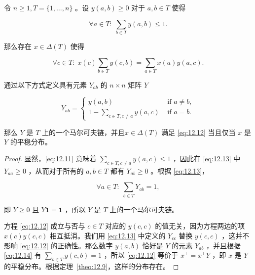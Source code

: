 \begin{lemma}\label{lem:12.10}
令 \(n \geq  1, T = \{ 1,\ldots ,n\}\) 。设 \(y\left( {a,b}\right)  \geq  0\) 对于 \(a,b \in  T\) 使得

\begin{equation}
\forall a \in  T : \;\mathop{\sum }\limits_{{b \in  T}}y\left( {a,b}\right)  \leq  1. \label{eq:12.11}
\end{equation}


那么存在 \(x \in  \Delta \left( T\right)\) 使得

\begin{equation}
\forall c \in  T : \;x\left( c\right) \mathop{\sum }\limits_{{b \in  T}}y\left( {c,b}\right)  = \mathop{\sum }\limits_{{a \in  T}}x\left( a\right) y\left( {a,c}\right) . \label{eq:12.12}
\end{equation}

通过以下方式定义具有元素 \({Y}_{ab}\) 的 \(n \times  n\) 矩阵 \(Y\)

\begin{equation}
{Y}_{ab} = \left\{  \begin{array}{ll} y\left( {a,b}\right) & \text{ if }a \neq  b, \\  1 - \mathop{\sum }\limits_{{c \in  T,c \neq  a}}y\left( {a,c}\right) & \text{ if }a = b. \end{array}\right.  \label{eq:12.13}
\end{equation}

那么 \(Y\) 是 \(T\) 上的一个马尔可夫链，并且\(x \in  \Delta \left( T\right)\) 满足 \eqref{eq:12.12} 当且仅当 \(x\) 是 \(Y\) 的平稳分布。
\end{lemma}

\begin{proof}
显然，\eqref{eq:12.11} 意味着 \(\mathop{\sum }\limits_{{c \in  T,c \neq  a}}y\left( {a,c}\right)  \leq  1\) ，因此在 \eqref{eq:12.13} 中 \({Y}_{aa} \geq  0\) ，从而对于所有的 \(a,b \in  T\) 都有 \({Y}_{ab} \geq  0\) 。根据 \eqref{eq:12.13}，

\begin{equation}
\forall a \in  T : \;\mathop{\sum }\limits_{{b \in  T}}{Y}_{ab} = 1, \label{eq:12.14}
\end{equation}



即 \(Y \geq  0\) 且 \(Y\bm{1} = \bm{1}\) ，所以 \(Y\) 是 \(T\) 上的一个马尔可夫链。

方程 \eqref{eq:12.12} 成立与否与 \(c \in  T\) 对应的 \(y\left( {c,c}\right)\) 的值无关，因为方程两边的项 \(x\left( c\right) y\left( {c,c}\right)\) 相互抵消。我们用 \eqref{eq:12.13} 中定义的 \({Y}_{cc}\) 替换 \(y\left( {c,c}\right)\) ，这并不影响 \eqref{eq:12.12} 的正确性。那么数字 \(y\left( {a,b}\right)\) 恰好是 \(Y\) 的元素 \({Y}_{ab}\) ，并且根据 \eqref{eq:12.14} 有 \(\mathop{\sum }\limits_{{b \in  T}}y\left( {c,b}\right)  = 1\) ，所以 \eqref{eq:12.12} 等价于 \({x}^{\top } = {x}^{\top }Y\) ，即 \(x\) 是 \(Y\) 的平稳分布。根据定理~\ref{theo:12.9}，这样的分布存在。
\end{proof}

